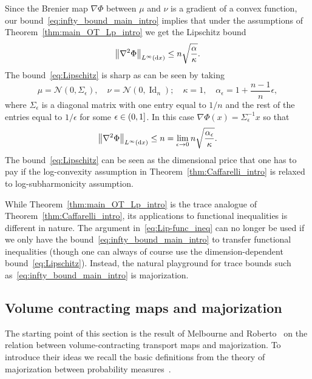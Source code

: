 \documentclass[AHL,Unicode,longabstracts]{cedram}
\DeclareMathOperator{\Id}{Id}
\newcommand{\dd}{n}
\newcommand{\source}{\mu}
\newcommand{\target}{\nu}
\newcommand{\lsh}{\alpha}
\newcommand{\lc}{\kappa}
\newcommand*\diff{\mathop{}\!\mathrm{d}}
\newcommand{\clN}{\mathcal{N}}
\newcommand{\OT}{\Phi}
\renewcommand*{\to}{\mathchoice{\longrightarrow}{\rightarrow}{\rightarrow}{\rightarrow}}
\let\originalleft\left
\let\originalright\right
\renewcommand{\left}{\mathopen{}\mathclose\bgroup\originalleft}
\renewcommand{\right}{\aftergroup\egroup\originalright}
\let\oldin\in
\renewcommand{\in}{\mathchoice{\oldin}{\oldin}{\,\oldin\,}{\,\oldin\,}}
\begin{document}
\begin{rema}\label{rem:Lipschiz}
Since the Brenier map $\nabla\OT$ between $\source$ and $\target$ is a gradient of a convex function, our bound~\eqref{eq:infty_bound_main_intro} implies that under the assumptions of Theorem~\ref{thm:main_OT_Lp_intro} we get the Lipschitz bound
\begin{equation}\label{eq:Lipschitz}
\left\|\nabla^2\OT\right\|_{L^{\infty}(\diff x)}\le\dd \sqrt{ \frac{\lsh}{\lc}}.
\end{equation}
The bound~\eqref{eq:Lipschitz} is sharp as can be seen by taking
\[
\source=\clN(0,\Sigma_{\epsilon}),\quad \target=\clN(0,\Id_{\dd}); \quad \lc=1, \quad \lsh_{\epsilon}=1+\frac{\dd-1}{\dd}\epsilon,
\]
where $\Sigma_{\epsilon}$ is a diagonal matrix with one entry equal to $1/\dd$ and the rest of the entries equal to $1/\epsilon$ for some $\epsilon\in (0,1]$. In this case $\nabla\OT(x)=\Sigma_{\epsilon}^{-1}x$ so that
\[
\left\|\nabla^2\OT\right\|_{L^{\infty}(\diff x)}\le \dd=\lim_{\epsilon\to 0}\dd \sqrt{ \frac{\lsh_{\epsilon}}{\lc}}.
\]
The bound~\eqref{eq:Lipschitz} can be seen as the dimensional price that one has to pay if the log-convexity assumption in Theorem~\ref{thm:Caffarelli_intro} is relaxed to log-subharmonicity assumption.
\end{rema}

While Theorem~\ref{thm:main_OT_Lp_intro} is the trace analogue of Theorem~\ref{thm:Caffarelli_intro}, its applications to functional inequalities is different in nature. The argument in~\eqref{eq:Lip-func_ineq} can no longer be used if we only have the bound~\eqref{eq:infty_bound_main_intro} to transfer functional inequalities (though one can always of course use the dimension-dependent bound~\eqref{eq:Lipschitz}). Instead, the natural playground for trace bounds such as~\eqref{eq:infty_bound_main_intro} is majorization.



\subsection{Volume contracting maps and majorization}\label{subsec:vol_contract_majorization}
The starting point of this section is the result of Melbourne and Roberto~\cite{MR2023} on the relation between volume-contracting transport maps and majorization. To introduce their ideas we recall the basic definitions from the theory of majorization between probability measures~\cite{marshall2011inequalities}.
\end{document}
